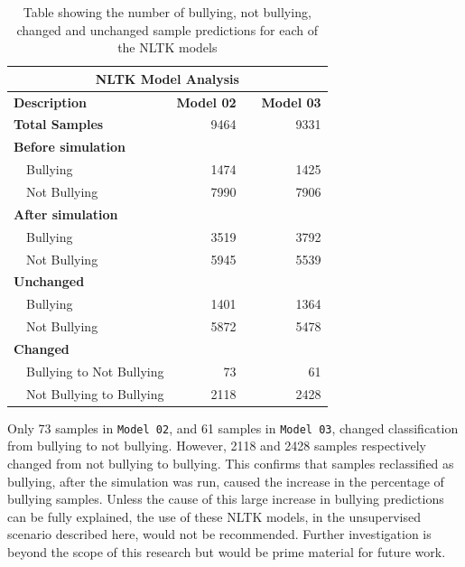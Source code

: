 \begin{table}[h]
\centering
\caption[NLTK Models, analysis of samples predicted]{Table showing the number of bullying, not bullying, changed and unchanged sample predictions for each of the NLTK models}
\label{tab:chapter5:nltk_model_analysis}
\begin{tabular}{llrcr}
	\multicolumn{5}{c}{\textbf{NLTK Model Analysis}}  \\
    \toprule
	\multicolumn{2}{l}{\textbf{Description }} & \textbf{Model 02} &  &  \textbf{Model 03} \\
    \midrule
	\multicolumn{2}{l}{\textbf{Total Samples}} & 9464 &  & 9331  \\
	\multicolumn{2}{l}{\textbf{Before simulation}} &  &  &   \\
	 & Bullying     & 1474 &  & 1425  \\
	 & Not Bullying & 7990 &  & 7906  \\
	\multicolumn{2}{l}{\textbf{After simulation}} &  &  &   \\
	 & Bullying     & 3519 &  & 3792  \\
	 & Not Bullying & 5945 &  & 5539  \\
	\multicolumn{2}{l}{\textbf{Unchanged}} &  &  &   \\
	 & Bullying     & 1401 &  & 1364  \\
	 & Not Bullying & 5872 &  & 5478  \\
	\multicolumn{2}{l}{\textbf{Changed}} &  &  &   \\
	 & Bullying to Not Bullying  & 73 &  & 61  \\
	 & Not Bullying  to Bullying & 2118 &  & 2428  \\
	\bottomrule
	\end{tabular}
\end{table}

Only 73 samples in \verb|Model 02|, and 61 samples in \verb|Model 03|, changed classification from bullying to not bullying. However, 2118 and 2428 samples respectively changed from not bullying to bullying. This confirms that samples reclassified as bullying, after the simulation was run, caused the increase in the percentage of bullying samples. Unless the cause of this large increase in bullying predictions can be fully explained, the use of these NLTK models, in the unsupervised scenario described here, would not be recommended. Further investigation is beyond the scope of this research but would be prime material for future work.

